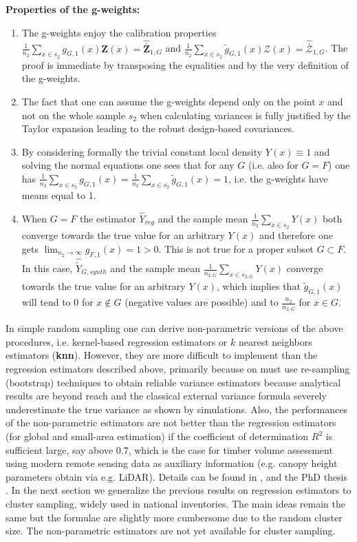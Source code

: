 \documentclass[a4paper,12pt,leqno, titlepage]{article}
\begin{document}
\textbf{Properties of the g-weights:}\label{gweights}
 \begin{enumerate}
 \item
 The g-weights enjoy the calibration properties
 $\frac{1}{n_2}\sum_{x\in{s_2}}g_{G,1}(x)\pmb{Z}(x)=
 \hat{\bar{\pmb{Z}}}_{1,G}$  and  $\frac{1}{n_2}\sum_{x\in{s_2}}\tilde{g}_{G,1}(x)\pmb{\mathcal{Z}}(x)=
 \hat{\bar{\pmb{\mathcal{Z}}}}_{1,G}$. The proof is immediate by transposing the equalities and by the very definition of the g-weights.
 \item
  The fact that one can assume the g-weights depend only on the point $x$ and not on the whole sample $s_2$ when calculating variances is fully justified by the Taylor expansion leading to the robust design-based covariances.
 \item
 By considering formally the trivial constant local density $Y(x)\equiv 1$ and solving the normal equations one sees that for any $G$ (i.e. also for $G=F$) one has
 $\frac{1}{n_2}\sum_{x\in{s_2}}g_{G,1}(x)=
  \frac{1}{n_2}\sum_{x\in{s_2}}\tilde{g}_{G,1}(x)=1$, i.e. the g-weights have means equal to 1.
 \item
  When $G=F$ the estimator $\hat{Y}_{reg}$ and the sample mean $\frac{1}{n_2}\sum_{x\in{s_2}}Y(x)$ both converge towards the true value for an arbitrary $Y(x)$ and therefore one gets $\lim_{n_2\to\infty}g_{F,1}(x)=1>0$. This is not true for a proper subset $G\subset F$. In this case, $\hat{\tilde{Y}}_{G,synth}$ and the sample mean $\frac{1}{n_{2,G}}\sum_{x\in{s_{2,G}}}Y(x)$ converge towards the true value for an arbitrary $Y(x)$, which implies that $\tilde{g}_{G,1}(x)$ will tend to $0$ for $x\not\in{G}$ (negative values are possible) and to $\frac{n_2}{n_{2,G}} $ for $x\in{G}$.
 \end{enumerate}
In simple random sampling one can derive non-parametric versions of the above procedures, i.e. kernel-based regression estimators or $k$ nearest neighbors estimators (\textbf{knn}). However, they are more difficult to implement than the regression estimators described above, primarily because on must use re-sampling (bootstrap) techniques to obtain reliable variance estimators because analytical results are beyond reach and the classical external variance formula severely underestimate the true variance as shown by simulations. Also, the performances of the non-parametric estimators are not better than the regression estimators (for global and small-area estimation) if the coefficient of determination $R^2$ is sufficient large, say above $0.7$, which is the case for timber volume assessment using modern remote sensing data as auxiliary information (e.g. canopy height parameters obtain via e.g. LiDAR). Details can be found in \cite{mandallazreport4}, \cite{massey2} and the PhD thesis \cite{masseyphd}.
In the next section we generalize the previous results on regression estimators to cluster sampling, widely used in national inventories. The main ideas remain the same but the formulae are slightly more cumbersome due to the random cluster size. The non-parametric estimators are not yet available for cluster sampling.
\newpage
\end{document}
